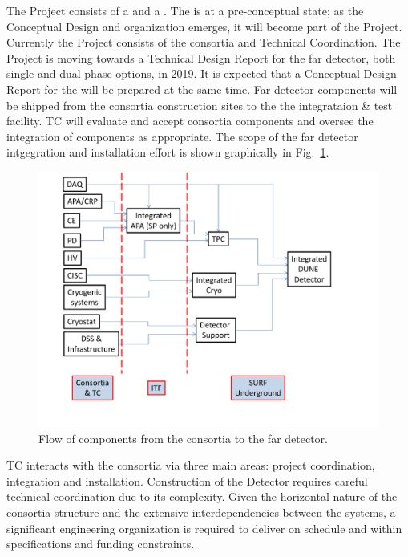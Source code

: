 The  Project consists of a  and a
. The  is at a pre-conceptual state; as the
Conceptual Design and organization emerges, it will become part of the
 Project. Currently the  Project consists of
the   consortia and Technical Coordination.  The
 Project is moving towards a Technical Design Report for
the far detector, both single and dual phase options, in 2019. It is
expected that a Conceptual Design Report for the  will be
prepared at the same time. Far detector components will be shipped
from the consortia construction sites to the the integrataion \& test
facility. TC will evaluate and accept consortia components and oversee the
integration of components as appropriate. The scope of the
far detector intgegration and installation effort is shown graphically in
Fig.~\ref{fig:TC_flow}.
\begin{figure}[htb]
  \begin{center}
    \includegraphics[width=\textwidth]{far-detector-generic/figures/DUNE_deliverable_flow}
    \caption{Flow of components from the consortia to the far detector.}
    \label{fig:TC_flow}
  \end{center}
\end{figure}

TC interacts with the consortia via three main areas: project
coordination, integration and installation.  Construction of the
 Detector requires careful technical coordination due to
its complexity.  Given the horizontal nature of the consortia
structure and the extensive interdependencies between the systems, a
significant engineering organization is required to deliver
 on schedule and within specifications and funding
constraints.

